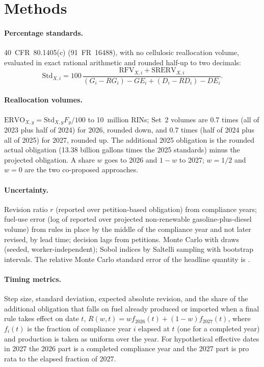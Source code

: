 \documentclass[11pt]{article}
\begin{document}
\section{Methods}
\paragraph{Percentage standards.} 40~CFR~80.1405(c) (91~FR~16488), with no cellulosic reallocation volume, evaluated in exact rational arithmetic and rounded half-up to two decimals:
\[
\mathrm{Std}_{X,i} = 100\,\frac{\mathrm{RFV}_{X,i} + \mathrm{SRERV}_{X,i}}{(G_i - RG_i) - GE_i + (D_i - RD_i) - DE_i}.
\]
\paragraph{Reallocation volumes.} $\mathrm{ERVO}_{X,y} = \mathrm{Std}_{X,y}F_y/100$ to 10~million RINs; Set~2 volumes are 0.7 times (all of 2023 plus half of 2024) for 2026, rounded down, and 0.7 times (half of 2024 plus all of 2025) for 2027, rounded up. The additional 2025 obligation is the rounded actual obligation (13.38 billion gallons times the 2025 standards) minus the projected obligation. A share $w$ goes to 2026 and $1-w$ to 2027; $w=1/2$ and $w=0$ are the two co-proposed approaches.
\paragraph{Uncertainty.} Revision ratio $r$ (reported over petition-based obligation) from \valnRevisionPairs{} compliance years; fuel-use error (log of reported over projected non-renewable gasoline-plus-diesel volume) from \valnFuelErrorsProspective{} rules in place by the middle of the compliance year and not later revised, by lead time; decision lags from \valnLagPetitions{} petitions. Monte Carlo with \valmcDraws{} draws (seeded, worker-independent); Sobol indices by Saltelli sampling with bootstrap intervals. The relative Monte Carlo standard error of the headline quantity is \valmcseHeadlineRelative{}.
\paragraph{Timing metrics.} Step size, standard deviation, expected absolute revision, and the share of the additional obligation that falls on fuel already produced or imported when a final rule takes effect on date $t$, $R(w,t) = w f_{2026}(t) + (1-w) f_{2027}(t)$, where $f_i(t)$ is the fraction of compliance year $i$ elapsed at $t$ (one for a completed year) and production is taken as uniform over the year. For hypothetical effective dates in 2027 the 2026 part is a completed compliance year and the 2027 part is pro rata to the elapsed fraction of 2027.
\end{document}
